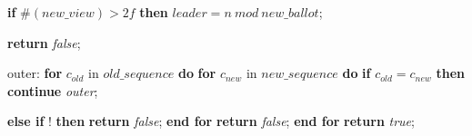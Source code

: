 \begin{algorithm}
\begin{algorithmic}[1]
		\State\hspace{\algorithmicindent} \textbf{if} $\#(new\_view) > 2f$ \textbf{then}
		\State\hspace{\algorithmicindent}\hspace{\algorithmicindent} $leader = n\ mod\ new\_ballot$;

		
		\State
		\State \textbf{return} \textit{false};
		\EndIf
		
		\State
		\item[] outer:	
		\State \textbf{for} $c_{old}$ in $old\_sequence$ \textbf{do}
		\State \hspace{\algorithmicindent} \textbf{for} $c_{new}$ in $new\_sequence$ \textbf{do}
		\State\hspace{\algorithmicindent}\hspace{\algorithmicindent} \textbf{if} $c_{old} = c_{new}$ \textbf{then}
		\State \hspace{\algorithmicindent}\hspace{\algorithmicindent}\hspace{\algorithmicindent} \textbf{continue} \textit{outer};
		
		\State \hspace{\algorithmicindent}\hspace{\algorithmicindent} \textbf{else if} ! \textbf{then}
		\State\hspace{\algorithmicindent}\hspace{\algorithmicindent}\hspace{\algorithmicindent} \textbf{return} \textit{false};
		\State \hspace{\algorithmicindent}\textbf{end for}
		\State \hspace{\algorithmicindent}\textbf{return} \textit{false};
		\State \textbf{end for}
		\State
		\State \textbf{return} \textit{true};
		\EndFunction
	\end{algorithmic}
\end{algorithm}

